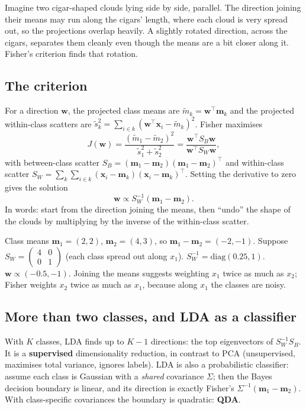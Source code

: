 \begin{intuition}
Imagine two cigar-shaped clouds lying side by side, parallel. The direction joining their means may run along the cigars'
length, where each cloud is very spread out, so the projections overlap heavily. A slightly rotated direction, across the
cigars, separates them cleanly even though the means are a bit closer along it. Fisher's criterion finds that rotation.
\end{intuition}

\subsection{The criterion}
For a direction $\mathbf w$, the projected class means are $\tilde m_k = \mathbf w^\top\mathbf m_k$ and the projected within-class
scatters are $\tilde s_k^2 = \sum_{i\in k}(\mathbf w^\top\mathbf x_i - \tilde m_k)^2$. Fisher maximises
\[ J(\mathbf w) = \frac{(\tilde m_1 - \tilde m_2)^2}{\tilde s_1^2 + \tilde s_2^2} = \frac{\mathbf w^\top S_B\mathbf w}{\mathbf w^\top S_W\mathbf w}, \]
with between-class scatter $S_B = (\mathbf m_1 - \mathbf m_2)(\mathbf m_1 - \mathbf m_2)^\top$ and within-class scatter
$S_W = \sum_k\sum_{i\in k}(\mathbf x_i - \mathbf m_k)(\mathbf x_i - \mathbf m_k)^\top$. Setting the derivative to zero gives the solution
\[ \boxed{\mathbf w\propto S_W^{-1}(\mathbf m_1 - \mathbf m_2).} \]
In words: start from the direction joining the means, then ``undo'' the shape of the clouds by multiplying by the inverse of the
within-class scatter.

\begin{example}
Class means $\mathbf m_1 = (2, 2)$, $\mathbf m_2 = (4, 3)$, so $\mathbf m_1 - \mathbf m_2 = (-2, -1)$. Suppose
$S_W = \begin{pmatrix}4 & 0\\0 & 1\end{pmatrix}$ (each class spread out along $x_1$). $S_W^{-1} = \text{diag}(0.25, 1)$.
$\mathbf w\propto(-0.5, -1)$. Joining the means suggests weighting $x_1$ twice as much as $x_2$; Fisher weights $x_2$ twice as much as
$x_1$, because along $x_1$ the classes are noisy.
\end{example}

\subsection{More than two classes, and LDA as a classifier}
With $K$ classes, LDA finds up to $K - 1$ directions: the top eigenvectors of $S_W^{-1}S_B$. It is a \textbf{supervised}
dimensionality reduction, in contrast to PCA (unsupervised, maximises total variance, ignores labels).
LDA is also a probabilistic classifier: assume each class is Gaussian with a \emph{shared} covariance $\Sigma$; then the Bayes
decision boundary is linear, and its direction is exactly Fisher's $\Sigma^{-1}(\mathbf m_1 - \mathbf m_2)$. With class-specific
covariances the boundary is quadratic: \textbf{QDA}.

